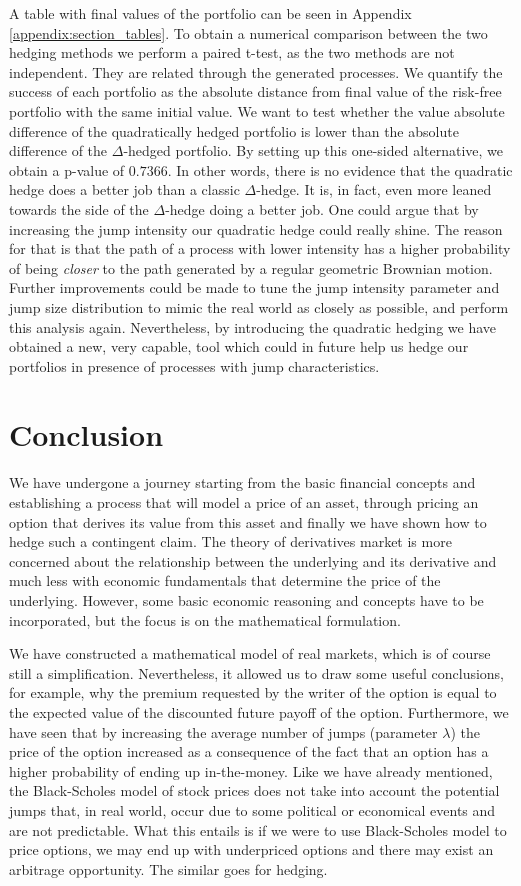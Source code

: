 \documentclass[times, utf8, diplomski]{fer}
\begin{document}
A table with final values of the portfolio can be seen in Appendix \ref{appendix:section_tables}. To obtain a numerical comparison between the two hedging methods we perform a paired t-test, as the two methods are not independent. They are related through the generated processes. We quantify the success of each portfolio as the absolute distance from final value of the  risk-free portfolio with the same initial value. We want to test whether the value absolute difference of the quadratically hedged portfolio is lower than the absolute difference of the $\Delta$-hedged portfolio. By setting up this one-sided alternative, we obtain a p-value of $0.7366$. In other words, there is no evidence that the quadratic hedge does a better job than a classic $\Delta$-hedge. It is, in fact, even more leaned towards the side of the $\Delta$-hedge doing a better job. One could argue that by increasing the jump intensity our quadratic hedge could really shine. The reason for that is that the path of a process with lower intensity has a higher probability of being \textit{closer} to the path generated by a regular geometric Brownian motion. Further improvements could be made to tune the jump intensity parameter and jump size distribution to mimic the real world as closely as possible, and perform this analysis again. Nevertheless, by introducing the quadratic hedging we have obtained a new, very capable, tool which could in future help us hedge our portfolios in presence of processes with jump characteristics.

\chapter{Conclusion}
We have undergone a journey starting from the basic financial concepts and establishing a process that will model a price of an asset, through pricing an option that derives its value from this asset and finally we have shown how to hedge such a contingent claim. The theory of derivatives market is more concerned about the relationship between the underlying and its derivative and much less with economic fundamentals that determine the price of the underlying. However, some basic economic reasoning and concepts have to be incorporated, but the focus is on the mathematical formulation. 

We have constructed a mathematical model of real markets, which is of course still a simplification. Nevertheless, it allowed us to draw some useful conclusions, for example, why the premium requested by the writer of the option is equal to the expected value of the discounted future payoff of the option. Furthermore, we have seen that by increasing the average number of jumps (parameter $\lambda$) the price of the option increased as a consequence of the fact that an option has a higher probability of ending up in-the-money. Like we have already mentioned, the Black-Scholes model of stock prices does not take into account the potential jumps that, in real world, occur due to some political or economical events and are not predictable. What this entails is if we were to use Black-Scholes model to price options, we may end up with underpriced options and there may exist an arbitrage opportunity. The similar goes for hedging.
\end{document}
